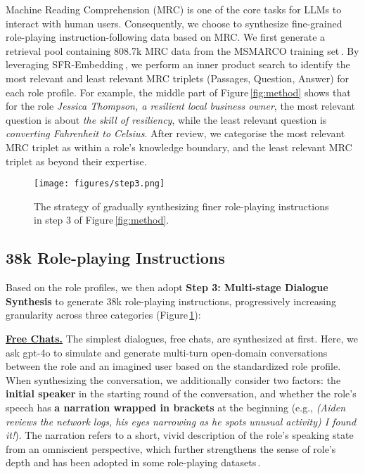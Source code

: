 Machine Reading Comprehension (MRC) is one of the core tasks for LLMs to interact with human users. Consequently, we choose to synthesize fine-grained role-playing instruction-following data based on MRC. We first generate a retrieval pool containing 808.7k MRC data from the MSMARCO training set\,\cite{bajaj2016ms}. By leveraging SFR-Embedding\,\cite{SFR-embedding-2}, we perform an inner product search to identify the most relevant and least relevant MRC triplets (Passages, Question, Answer) for each role profile. For example, the middle part of Figure\,\ref{fig:method} shows that for the role \emph{Jessica Thompson, a resilient local business owner}, the most relevant question is about \emph{the skill of resiliency}, while the least relevant question is \emph{converting Fahrenheit to Celsius}. After review, we categorise the most relevant MRC triplet as within a role's knowledge boundary, and the least relevant MRC triplet as beyond their expertise.

\begin{figure}[t]
    \centering
    \texttt{[image: figures/step3.png]}
    \caption{The strategy of gradually synthesizing finer role-playing instructions in step 3 of Figure\,\ref{fig:method}.}
    \vspace{-1.0em}
    \label{fig:step3}
\end{figure}

\subsection{38k Role-playing Instructions}
Based on the role profiles, we then adopt \textbf{Step 3: Multi-stage Dialogue Synthesis} to generate 38k role-playing instructions, progressively increasing granularity across three categories %
(Figure\,\ref{fig:step3}):

\noindent \textbf{\underline{Free Chats.}} The simplest dialogues, free chats, are synthesized at first. Here, we ask gpt-4o to simulate and generate multi-turn open-domain conversations between the role and an imagined user based on the standardized role profile. When synthesizing the conversation, we additionally consider two factors: the \textbf{initial speaker} in the starting round of the conversation, and whether the role's speech has \textbf{a narration wrapped in brackets} at the beginning (e.g., \emph{(Aiden reviews the network logs, his eyes narrowing as he spots unusual activity) I found it!}). The narration refers to a short, vivid description of the role's speaking state from an omniscient perspective, which further strengthens the sense of role's depth and has been adopted in some role-playing datasets\,\cite{tu2024charactereval}. 


